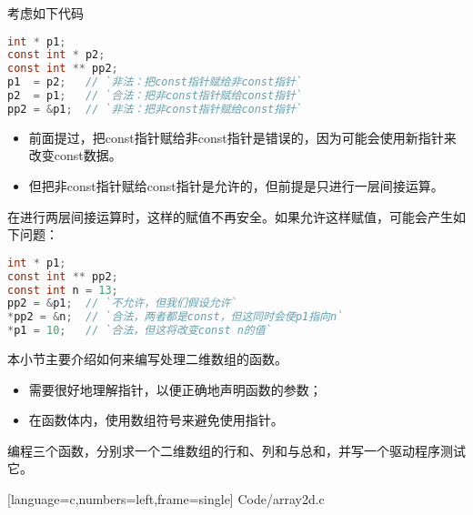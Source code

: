 \begin{frame}[fragile]
考虑如下代码
\begin{lstlisting}[language=c,backgroundcolor=\color{red!20}]
int * p1;
const int * p2;
const int ** pp2;
p1  = p2;   // `非法：把const指针赋给非const指针`
p2  = p1;   // `合法：把非const指针赋给const指针`
pp2 = &p1;  // `非法：把非const指针赋给const指针`
\end{lstlisting}
\begin{itemize}
\item
前面提过，把{\tf const}指针赋给非{\tf const}指针是错误的，因为可能会使用新指针来改变{\tf const}数据。
\item
但把非{\tf const}指针赋给{\tf const}指针是允许的，\textcolor{acolor1}{但前提是只进行一层间接运算。}
\end{itemize}
\end{frame}

\begin{frame}[fragile]
在进行两层间接运算时，这样的赋值不再安全。如果允许这样赋值，可能会产生如下问题：
\begin{lstlisting}[language=c,backgroundcolor=\color{red!20}]
int * p1;
const int ** pp2;
const int n = 13;
pp2 = &p1;  // `不允许，但我们假设允许`
*pp2 = &n;  // `合法，两者都是const，但这同时会使p1指向n`
*p1 = 10;   // `合法，但这将改变const n的值`
\end{lstlisting}
\end{frame}

\begin{frame}[fragile]
本小节主要介绍如何来编写处理二维数组的函数。\vspace{.1in}

\begin{itemize}
\item 需要很好地理解指针，以便正确地声明函数的参数；\\[0.1in]
\item 在函数体内，使用数组符号来避免使用指针。
\end{itemize}
\end{frame}

\begin{frame}[fragile]
编程三个函数，分别求一个二维数组的行和、列和与总和，并写一个驱动程序测试它。
\end{frame}

\begin{frame}

[language=c,numbers=left,frame=single]
{Code/array2d.c}
\end{frame}




